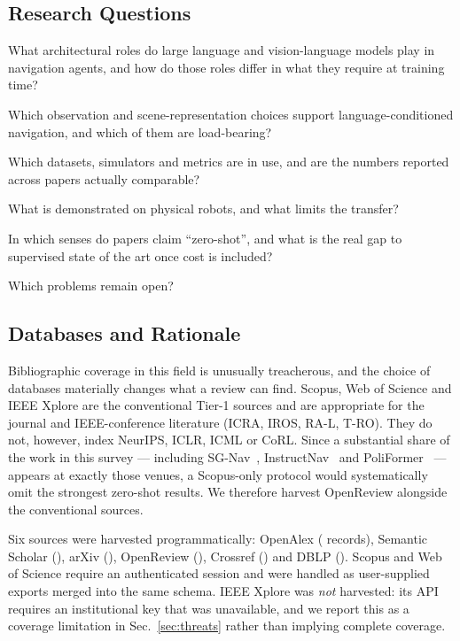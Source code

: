 \documentclass[journal]{IEEEtran}
\begin{document}
\subsection{Research Questions}
\begin{IEEEdescription}[\IEEEsetlabelwidth{RQ5}]
\item[RQ1] What architectural roles do large language and vision-language
models play in navigation agents, and how do those roles differ in what
they require at training time?
\item[RQ2] Which observation and scene-representation choices support
language-conditioned navigation, and which of them are load-bearing?
\item[RQ3] Which datasets, simulators and metrics are in use, and are the
numbers reported across papers actually comparable?
\item[RQ4] What is demonstrated on physical robots, and what limits the
transfer?
\item[RQ5] In which senses do papers claim ``zero-shot'', and what is the
real gap to supervised state of the art once cost is included?
\item[RQ6] Which problems remain open?
\end{IEEEdescription}

\subsection{Databases and Rationale}
Bibliographic coverage in this field is unusually treacherous, and the
choice of databases materially changes what a review can find. Scopus, Web
of Science and IEEE Xplore are the conventional Tier-1 sources and are
appropriate for the journal and IEEE-conference literature (ICRA, IROS,
RA-L, T-RO). They do not, however, index NeurIPS, ICLR, ICML or CoRL. Since
a substantial share of the work in this survey --- including
SG-Nav~\cite{yin2024online}, InstructNav~\cite{long2024instructnav} and
PoliFormer~\cite{zeng2024poliformer} --- appears at exactly those venues, a
Scopus-only protocol would systematically omit the strongest zero-shot
results. We therefore harvest OpenReview alongside the conventional
sources.

Six sources were harvested programmatically: OpenAlex
(\SrcOpenAlex{} records), Semantic Scholar (\SrcSemanticScholar{}), arXiv
(\SrcarXiv{}), OpenReview (\SrcOpenReview{}), Crossref (\SrcCrossref{}) and
DBLP (\SrcDBLP{}). Scopus and Web of Science require an authenticated
session and were handled as user-supplied exports merged into the same
schema. IEEE Xplore was \emph{not} harvested: its API requires an
institutional key that was unavailable, and we report this as a coverage
limitation in Sec.~\ref{sec:threats} rather than implying complete
coverage.
\end{document}
